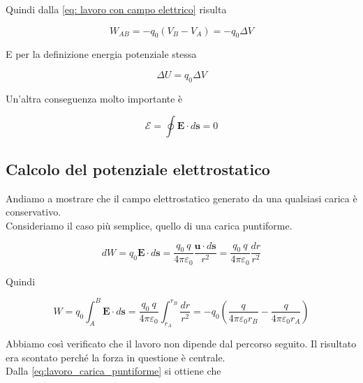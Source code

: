 Quindi dalla \ref{eq: lavoro con campo elettrico} risulta 

\begin{equation*}
    W_{AB} = -q_0 (V_B - V_A) = -q_0 \Delta V
\end{equation*}

E per la definizione energia potenziale stessa

\begin{equation*}
    \Delta U = q_0 \Delta V
\end{equation*}

Un'altra conseguenza molto importante è 

\begin{tcolorbox}[colback=yellow!10!white, colframe=orange!70!black, boxrule=0.8pt]
\begin{equation}
    \mathcal{E} = \oint \mathbf{E} \cdot d \mathbf{s}  = 0
\end{equation}
\end{tcolorbox}

\subsection{Calcolo del potenziale elettrostatico}

Andiamo a mostrare che il campo elettrostatico generato da una qualsiasi carica è conservativo. \\

Consideriamo il caso più semplice, quello di una carica puntiforme. 

\begin{equation*}
    dW = q_0 \mathbf{E} \cdot d \mathbf{s} = \frac{q_0\ q}{4\pi \varepsilon_0} \frac{\mathbf{u} \cdot d \mathbf{s}}{r^2} = \frac{q_0\ q}{4\pi \varepsilon_0} \frac{dr}{r^2}
\end{equation*}

Quindi 

\begin{equation}
    W = q_0\int_A ^B \mathbf{E \cdot} d \mathbf{s} = \frac{q_0 \ q}{4 \pi \varepsilon_0} \int_{r_A} ^{r_B} \frac{dr}{r^2} = -q_0 (\frac{q}{4\pi \varepsilon_0r_B}- \frac{q}{4\pi \varepsilon_0 r_A})
    \label{eq:lavoro_carica_puntiforme}
\end{equation}

Abbiamo così verificato che il lavoro non dipende dal percorso seguito. Il risultato era scontato perché la forza in questione è centrale. \\
Dalla \ref{eq:lavoro_carica_puntiforme} si ottiene che 

